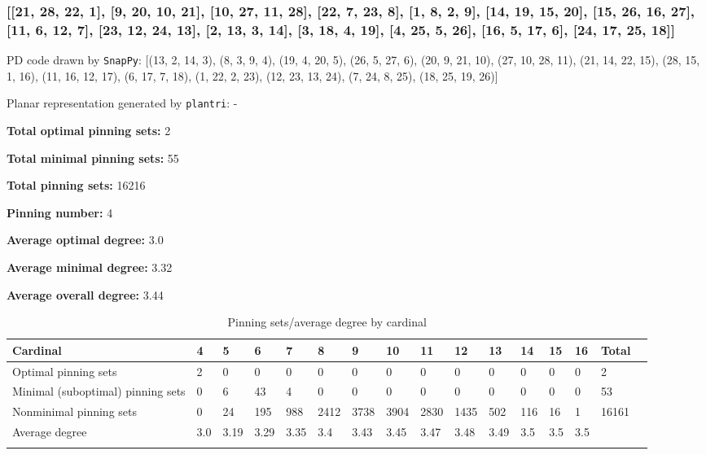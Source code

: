 \documentclass{article}%
\begin{document}
\newpage

\subsubsection{[[21, 28, 22, 1], [9, 20, 10, 21], [10, 27, 11, 28], [22, 7, 23, 8], [1, 8, 2, 9], [14, 19, 15, 20], [15, 26, 16, 27], [11, 6, 12, 7], [23, 12, 24, 13], [2, 13, 3, 14], [3, 18, 4, 19], [4, 25, 5, 26], [16, 5, 17, 6], [24, 17, 25, 18]]}

{\small\noindent PD code drawn by \texttt{SnapPy}: [(13, 2, 14, 3), (8, 3, 9, 4), (19, 4, 20, 5), (26, 5, 27, 6), (20, 9, 21, 10), (27, 10, 28, 11), (21, 14, 22, 15), (28, 15, 1, 16), (11, 16, 12, 17), (6, 17, 7, 18), (1, 22, 2, 23), (12, 23, 13, 24), (7, 24, 8, 25), (18, 25, 19, 26)]}

{\small\noindent Planar representation generated by \texttt{plantri}: -}

\begin{multicols}{2}
{\normalsize \noindent\textbf{Total optimal pinning sets:} 2

\noindent\textbf{Total minimal pinning sets:} 55

\noindent\textbf{Total pinning sets:} 16216

\noindent\textbf{Pinning number:} 4

}
\columnbreak

{\normalsize \noindent\textbf{Average optimal degree:} 3.0

\noindent\textbf{Average minimal degree:} 3.32

\noindent\textbf{Average overall degree:} 3.44

}
\end{multicols}

\begin{table}[ht]
	\caption{Pinning sets/average degree by cardinal}
	\centering
	\renewcommand{\arraystretch}{1.5}
	\begin{tabularx}{\textwidth}{lXXXXXXXXXXXXXXX}
		\toprule
			Cardinal & 4 & 5 & 6 & 7 & 8 & 9 & 10 & 11 & 12 & 13 & 14 & 15 & 16 & Total\\
			\hline
			Optimal pinning sets & 2 & 0 & 0 & 0 & 0 & 0 & 0 & 0 & 0 & 0 & 0 & 0 & 0 & 2 \\
			Minimal (suboptimal) pinning sets & 0 & 6 & 43 & 4 & 0 & 0 & 0 & 0 & 0 & 0 & 0 & 0 & 0 & 53 \\
			Nonminimal pinning sets & 0 & 24 & 195 & 988 & 2412 & 3738 & 3904 & 2830 & 1435 & 502 & 116 & 16 & 1 & 16161 \\
			Average degree & 3.0 & 3.19 & 3.29 & 3.35 & 3.4 & 3.43 & 3.45 & 3.47 & 3.48 & 3.49 & 3.5 & 3.5 & 3.5 &  \\
		\bottomrule \\ 
	\end{tabularx}
\end{table}
\end{document}
